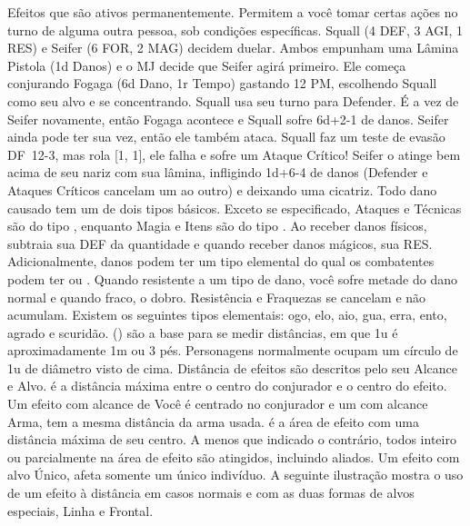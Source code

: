  Efeitos que são ativos permanentemente. \ofgap
{} Permitem a você tomar certas ações no turno de alguma outra pessoa, sob condições específicas.
%
\vfill
%
{
	Squall (4 DEF, 3 AGI, 1 RES) e Seifer (6 FOR, 2 MAG) decidem duelar. 
	Ambos empunham uma Lâmina Pistola (1d Danos) e o MJ decide que Seifer agirá primeiro. 
	Ele começa conjurando Fogaga (6d Dano, 1r Tempo) gastando 12 PM, escolhendo Squall como seu alvo e se concentrando. 
	Squall usa seu turno para Defender. 
	É a vez de Seifer novamente, então Fogaga acontece e Squall sofre \mbox{6d+2-1} de danos. 
	Seifer ainda pode ter sua vez, então ele também ataca. 
	Squall faz um teste de evasão \mbox{DF 12-3}, mas rola [1, 1], ele falha e sofre um Ataque Crítico! 
	Seifer o atinge bem acima de seu nariz com sua lâmina, infligindo \mbox{1d+6-4} de danos (Defender e Ataques Críticos cancelam um ao outro) e deixando uma cicatriz.
}
%
\clearpage
%
\newcommand{\elemicon}[1]{\hspace*{-0.14cm}#1\hspace*{-0.14cm}}
Todo dano causado tem um de dois tipos básicos. 
Exceto se especificado, Ataques e Técnicas são do tipo , enquanto Magia e Itens são do tipo . 
Ao receber danos físicos, subtraia sua DEF da quantidade e quando receber danos mágicos, sua RES. 
Adicionalmente, danos podem ter um tipo elemental do qual os combatentes podem ter  ou . 
Quando resistente a um tipo de dano, você sofre metade do dano normal e quando fraco, o dobro. 
Resistência e Fraquezas se cancelam e não acumulam. Existem os seguintes tipos elementais: \elemicon{\fire}ogo, \elemicon{\ice}elo, \elemicon{\lightning}aio, \elemicon{\water}gua, \elemicon{\earth}erra, \elemicon{\wind}ento, \elemicon{\holy}agrado e \elemicon{\dark}scuridão.
%
\vfill
%
 () são a base para se medir distâncias, em que 1u é aproximadamente 1m ou 3 pés. 
Personagens normalmente ocupam um círculo de 1u de diâmetro visto de cima. 
Distância de efeitos são descritos pelo seu Alcance e Alvo. 
 é a distância máxima entre o centro do conjurador e o centro do efeito. 
Um efeito com alcance de Você é centrado no conjurador e um com alcance Arma, tem a mesma distância da arma usada. 
 é a área de efeito com uma distância máxima de seu centro. A menos que indicado o contrário, todos inteiro ou parcialmente na área de efeito são atingidos, incluindo aliados. 
Um efeito com alvo Único, afeta somente um único indivíduo. A seguinte ilustração mostra o uso de um efeito à distância em casos normais e com as duas formas de alvos especiais, Linha e Frontal.
